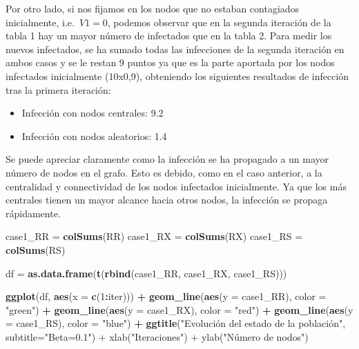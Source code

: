 \documentclass[
]{article}
\newenvironment{Shaded}{\begin{snugshade}}{\end{snugshade}}
\newcommand{\DataTypeTok}[1]{\textcolor[rgb]{0.13,0.29,0.53}{#1}}
\newcommand{\DecValTok}[1]{\textcolor[rgb]{0.00,0.00,0.81}{#1}}
\newcommand{\FloatTok}[1]{\textcolor[rgb]{0.00,0.00,0.81}{#1}}
\newcommand{\KeywordTok}[1]{\textcolor[rgb]{0.13,0.29,0.53}{\textbf{#1}}}
\newcommand{\NormalTok}[1]{#1}
\newcommand{\OperatorTok}[1]{\textcolor[rgb]{0.81,0.36,0.00}{\textbf{#1}}}
\newcommand{\StringTok}[1]{\textcolor[rgb]{0.31,0.60,0.02}{#1}}
\begin{document}
Por otro lado, si nos fijamos en los nodos que no estaban contagiados
inicialmente, i.e.~\(V1=0\), podemos observar que en la segunda
iteración de la tabla 1 hay un mayor número de infectados que en la
tabla 2. Para medir los nuevos infectados, se ha sumado todas las
infecciones de la segunda iteración en ambos casos y se le restan 9
puntos ya que es la parte aportada por los nodos infectados inicialmente
(10x0,9), obteniendo los siguientes resultados de infección tras la
primera iteración:

\begin{itemize}
\item
  Infección con nodos centrales: 9.2
\item
  Infección con nodos aleatorios: 1.4
\end{itemize}

Se puede apreciar claramente como la infección se ha propagado a un
mayor número de nodos en el grafo. Esto es debido, como en el caso
anterior, a la centralidad y connectividad de los nodos infectados
inicialmente. Ya que los más centrales tienen un mayor alcance hacia
otros nodos, la infección se propaga rápidamente.

\begin{Shaded}
\begin{Highlighting}[]
\NormalTok{case1_RR =}\StringTok{ }\KeywordTok{colSums}\NormalTok{(RR)}
\NormalTok{case1_RX =}\StringTok{ }\KeywordTok{colSums}\NormalTok{(RX)}
\NormalTok{case1_RS =}\StringTok{ }\KeywordTok{colSums}\NormalTok{(RS)}

\NormalTok{df =}\StringTok{ }\KeywordTok{as.data.frame}\NormalTok{(}\KeywordTok{t}\NormalTok{(}\KeywordTok{rbind}\NormalTok{(case1_RR, case1_RX, case1_RS)))}

\KeywordTok{ggplot}\NormalTok{(df, }\KeywordTok{aes}\NormalTok{(}\DataTypeTok{x =} \KeywordTok{c}\NormalTok{(}\DecValTok{1}\OperatorTok{:}\NormalTok{iter))) }\OperatorTok{+}
\StringTok{  }\KeywordTok{geom_line}\NormalTok{(}\KeywordTok{aes}\NormalTok{(}\DataTypeTok{y =}\NormalTok{ case1_RR), }\DataTypeTok{color =} \StringTok{"green"}\NormalTok{) }\OperatorTok{+}
\StringTok{  }\KeywordTok{geom_line}\NormalTok{(}\KeywordTok{aes}\NormalTok{(}\DataTypeTok{y =}\NormalTok{ case1_RX), }\DataTypeTok{color =} \StringTok{"red"}\NormalTok{) }\OperatorTok{+}
\StringTok{  }\KeywordTok{geom_line}\NormalTok{(}\KeywordTok{aes}\NormalTok{(}\DataTypeTok{y =}\NormalTok{ case1_RS), }\DataTypeTok{color =} \StringTok{"blue"}\NormalTok{) }\OperatorTok{+}
\StringTok{  }\KeywordTok{ggtitle}\NormalTok{(}\StringTok{"Evolución del estado de la población", subtitle="}\DataTypeTok{Beta=}\FloatTok{0.1}\StringTok{") +}
\StringTok{  xlab("}\NormalTok{Iteraciones}\StringTok{") + ylab("}\NormalTok{Número de nodos}\StringTok{")}
\end{Highlighting}
\end{Shaded}
\end{document}
